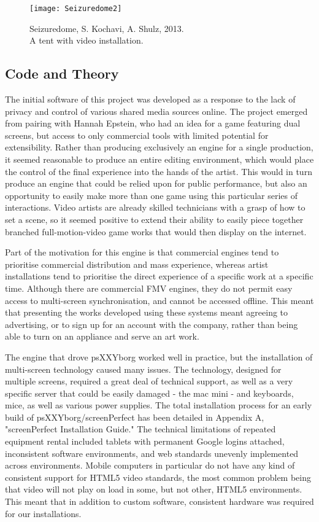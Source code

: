 \begin{figure}[!ht]
\centering
  \texttt{[image: Seizuredome2]}
 \caption{Seizuredome, S. Kochavi, A. Shulz, 2013.\\ A tent with video installation.}
\end{figure}

\subsection{Code and Theory}
The initial software of this project was developed as a response to the lack of privacy and control of various shared media sources online. The project emerged from pairing with Hannah Epstein, who had an idea for a game featuring dual screens, but access to only commercial tools with limited potential for extensibility. Rather than producing exclusively an engine for a single production, it seemed reasonable to produce an entire editing environment, which would place the control of the final experience into the hands of the artist. This would in turn produce an engine that could be relied upon for public performance, but also an opportunity to easily make more than one game using this particular series of interactions. Video artists are already skilled technicians with a grasp of how to set a scene, so it seemed positive to extend their ability to easily piece together branched full-motion-video game works that would then display on the internet. 

Part of the motivation for this engine is that commercial engines tend to prioritise commercial distribution and mass experience, whereas artist installations tend to prioritise the direct experience of a specific work at a specific time. Although there are commercial FMV engines, they do not permit easy access to multi-screen synchronisation, and cannot be accessed offline. This meant that presenting the works developed using these systems meant agreeing to advertising, or to sign up for an account with the company, rather than being able to turn on an appliance and serve an art work.

The engine that drove psXXYborg worked well in practice, but the installation of multi-screen technology caused many issues. The technology, designed for multiple screens, required a great deal of technical support, as well as a very specific server that could be easily damaged - the mac mini - and keyboards, mice, as well as various power supplies. The total installation process for an early build of psXXYborg/screenPerfect has been detailed in Appendix A, "screenPerfect Installation Guide." The technical limitations of repeated equipment rental included tablets with permanent Google logins attached, inconsistent software environments, and web standards unevenly implemented across environments. Mobile computers in particular do not have any kind of consistent support for HTML5 video standards, the most common problem being that video will not play on load in some, but not other, HTML5 environments. This meant that in addition to custom software, consistent hardware was required for our installations.

